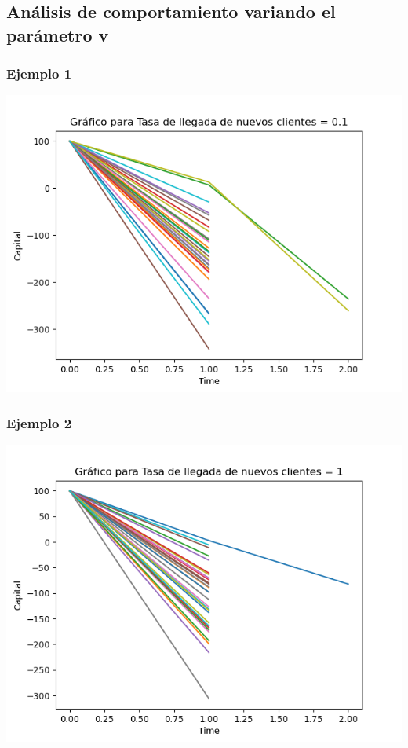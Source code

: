 \documentclass{article}
\begin{document}
 \subsection{Análisis de comportamiento variando el parámetro v}

 \subsubsection{Ejemplo 1}
 \includegraphics[scale = 0.8]{v1.png}

 \subsubsection{Ejemplo 2}
 \includegraphics[scale = 0.8]{v2.png}
\end{document}
